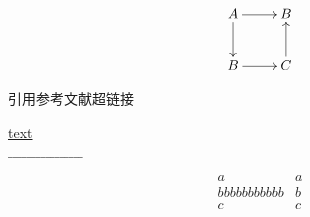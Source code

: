 \documentclass[UTF8, a4paper, 12pt, oneside, onecolumn]{article}
\begin{document}
\begin{equation}\label{cdd}
\xymatrix{
A \ar[d] \ar[r] & B \\
B \ar[r] & C \ar[u]}
\end{equation}

\pageref{TotPages}

引用参考文献超链接

\hyperref[cdd]{text}

$\_\_\_\_\_\_\_\_\_\_\_\_\_\_\_\_$

\begin{equation*}
\begin{split}
    a \\
     bbbbbbbbbbb \\
      c
  \end{split}
  \begin{array}{c}
    a \\
    b \\
    c
  \end{array}
\end{equation*}
\end{document}
